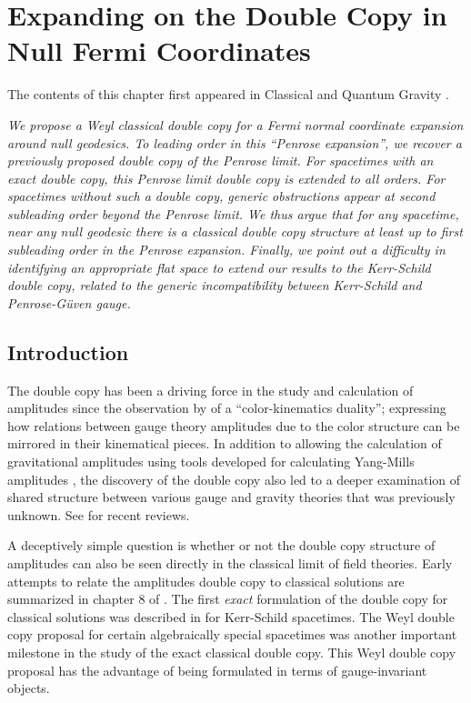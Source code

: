 \chapter{Expanding on the Double Copy in Null Fermi Coordinates}  \label{chap:PenroseExpansion}

The contents of this chapter first appeared in Classical and Quantum Gravity \cite{Chawla:2025uwu}.

\textit{We propose a Weyl classical double copy for a Fermi normal coordinate expansion around null geodesics. To
leading order in this ``Penrose expansion'', we recover a previously proposed double copy of the Penrose limit. For
spacetimes with an exact double copy, this Penrose limit double copy is extended to all orders. For spacetimes
without such a double copy, generic obstructions appear at second subleading order beyond the Penrose limit. We
thus argue that for \emph{any} spacetime, near \emph{any} null geodesic there is a classical double copy structure
at least up to first subleading order in the Penrose expansion. Finally, we point out a difficulty in identifying
an appropriate flat space to extend our results to the Kerr-Schild double copy, related to the generic
incompatibility between Kerr-Schild and Penrose-G\"uven gauge.}

\section{Introduction}


The double copy has been a driving force in the study and calculation of amplitudes since the observation by
\cite{Bern:2008qj} of a ``color-kinematics duality''; expressing how relations between gauge theory amplitudes due to the color structure can be mirrored in their kinematical pieces. In addition to allowing the calculation of gravitational amplitudes using tools
developed for calculating Yang-Mills amplitudes
\cite{Bern:2019nnu,Bern:2019crd,Bern:2020uwk,Bern:2021yeh,Bern:2022jvn}, the discovery of the double copy also led
to a deeper examination of shared structure between various gauge and gravity theories that was previously unknown.
See \cite{Bern:2019prr,Kosower:2022yvp,White:2024pve} for recent reviews.

A deceptively simple question is whether or not the double copy structure of amplitudes can also be seen directly in the classical limit of field theories. Early attempts to relate the
amplitudes double copy to classical solutions are summarized in chapter 8 of \cite{Bern:2019prr}. The
first \textit{exact} formulation of the double copy for classical solutions was described in \cite{Monteiro:2014cda} for Kerr-Schild spacetimes. The Weyl double copy proposal for
certain algebraically special spacetimes
\cite{Luna:2018dpt} was another important milestone in the study of the exact classical double copy. This Weyl double copy proposal has the advantage of being formulated in terms of gauge-invariant objects. 

